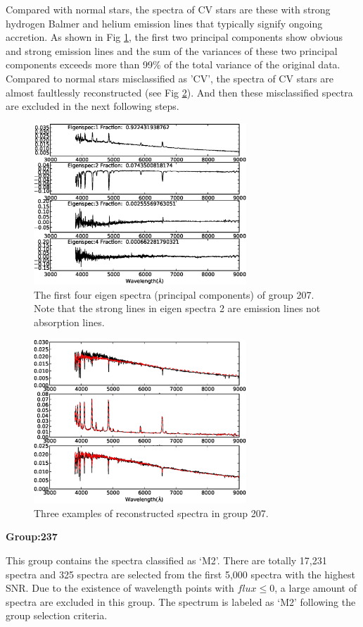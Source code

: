 \documentclass[referee]{raa}            %
\begin{document}
Compared with normal stars, the spectra of CV stars are these with strong hydrogen Balmer and helium emission lines that typically signify ongoing accretion.
As shown in Fig \ref{Fig73}, the first two principal components show obvious and strong emission lines and the sum of the variances of these two  principal components  exceeds more than 99\% of the total variance of the original data.
Compared to normal stars misclassified as 'CV', the spectra of CV stars are almost faultlessly reconstructed (see Fig \ref{Fig83}).
And then these misclassified spectra are excluded in the next following steps.
 \begin{figure}
   \centering
   \includegraphics[width=8cm, angle=0,clip]{f73.eps}
   \caption{The first four eigen spectra (principal components) of group 207.
    Note that the strong lines in eigen spectra 2 are emission lines not absorption lines.
   }
   \label{Fig73}
\end{figure}

 \begin{figure}
   \centering
   \includegraphics[width=8cm, angle=0,clip]{f83.eps}
   \caption{Three examples of reconstructed spectra in group 207.
   }
   \label{Fig83}
\end{figure}
\textbf{Group:237}

This group contains the spectra classified as `M2'.
There are totally 17,231 spectra and 325 spectra are selected from the first 5,000 spectra with the highest SNR.
Due to the existence of wavelength points with $flux\le0$, a large amount of  spectra are excluded in this group.
The spectrum is labeled as `M2' following the group selection criteria.
\end{document}
